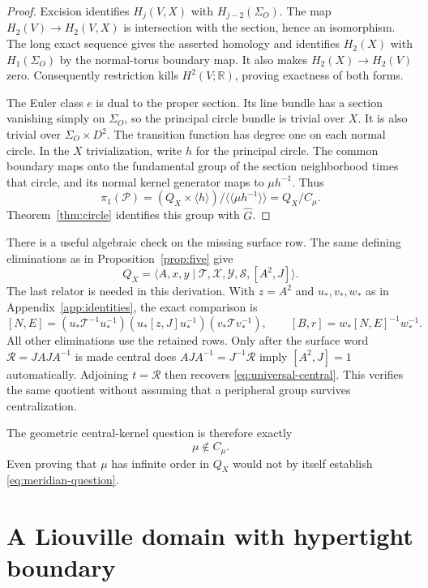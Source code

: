 \documentclass[11pt]{amsart}
\theoremstyle{definition}
\theoremstyle{remark}
\newcommand{\nc}[1]{\langle\!\langle #1\rangle\!\rangle}
\begin{document}
\begin{proof}
Excision identifies $H_j(V,X)$ with $H_{j-2}(\Sigma_O)$.
The map $H_2(V)\to H_2(V,X)$ is intersection with the section,
hence an isomorphism. The long exact sequence gives the asserted
homology and identifies $H_2(X)$ with $H_1(\Sigma_O)$ by the
normal-torus boundary map. It also makes $H_2(X)\to H_2(V)$ zero.
Consequently restriction kills $H^2(V;\mathbb R)$, proving exactness
of both forms.

The Euler class $e$ is dual to the proper section. Its line bundle
has a section vanishing simply on $\Sigma_O$, so the principal
circle bundle is trivial over $X$. It is also trivial over
$\Sigma_O\times D^2$. The transition function has degree one on
each normal circle. In the $X$ trivialization, write $h$ for the
principal circle. The common boundary maps onto the fundamental
group of the section neighborhood times that circle, and its normal
kernel generator maps to $\mu h^{-1}$. Thus
\[
 \pi_1(\mathcal P)
 =(Q_X\times\langle h\rangle)/\nc{\mu h^{-1}}
 =Q_X/C_\mu.
\]
Theorem~\ref{thm:circle} identifies this group with $\widehat G$.
\end{proof}

There is a useful algebraic check on the missing surface row. The
same defining eliminations as in Proposition~\ref{prop:five} give
\begin{equation}\label{eq:exterior-five}
 Q_X=\langle A,x,y\mid
 \mathcal T,\mathcal X,\mathcal Y,\mathcal S,[A^2,J]\rangle.
\end{equation}
The last relator is needed in this derivation. With $z=A^2$ and $u_*,v_*,w_*$
as in Appendix~\ref{app:identities}, the exact comparison is
\[
 [N,E]=(u_*\mathcal T^{-1}u_*^{-1})
        (u_*[z,J]u_*^{-1})(v_*\mathcal T v_*^{-1}),
 \qquad [B,r]=w_*[N,E]^{-1}w_*^{-1}.
\]
All other eliminations use the retained rows. Only after the surface
word $\mathcal R=JAJA^{-1}$ is made central does
$AJA^{-1}=J^{-1}\mathcal R$ imply $[A^2,J]=1$ automatically.
Adjoining $t=\mathcal R$ then recovers \eqref{eq:universal-central}.
This verifies the same quotient without assuming that a peripheral
group survives centralization.

The geometric central-kernel question is therefore exactly
\begin{equation}\label{eq:meridian-question}
                         \mu\notin C_\mu.
\end{equation}
Even proving that $\mu$ has infinite order in $Q_X$ would not by
itself establish \eqref{eq:meridian-question}.

\section{A Liouville domain with hypertight boundary}\label{sec:contact}
\end{document}
